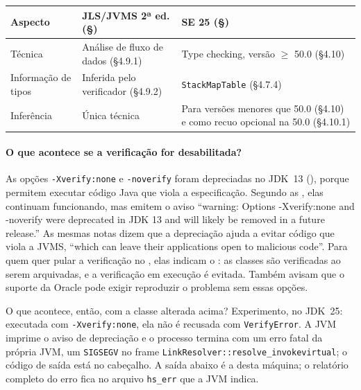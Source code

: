 \begin{center}
\begin{tabular}{@{}p{}p{}p{}@{}}
\toprule
Aspecto & JLS/JVMS 2ª ed. (§) & SE 25 (§) \\
\midrule
Técnica & Análise de fluxo de dados (§4.9.1) & Type checking, versão
$\geq$ 50.0 (§4.10) \\
Informação de tipos & Inferida pelo verificador (§4.9.2) &
\texttt{StackMapTable} (§4.7.4) \\
Inferência & Única técnica & Para versões menores que 50.0 (§4.10) e
como recuo opcional na 50.0 (§4.10.1) \\
\bottomrule
\end{tabular}
\end{center}

\paragraph{O que acontece se a verificação for desabilitada?}
As opções \texttt{-Xverify:none} e \texttt{-noverify} foram depreciadas
no JDK~13 (), porque permitem executar código
Java que viola a especificação. Segundo as ,
elas continuam funcionando, mas emitem o aviso \enquote{warning: Options
-Xverify:none and -noverify were deprecated in JDK 13 and will likely be
removed in a future release.} As mesmas notas dizem que a depreciação
ajuda a evitar código que viola a JVMS, \enquote{which can leave their
applications open to malicious code}. Para quem quer pular a verificação
no , elas indicam o
: as classes são
verificadas ao serem arquivadas, e a verificação em execução é evitada.
Também avisam que o suporte da Oracle pode exigir reproduzir o problema
sem essas opções.

O que acontece, então, com a classe alterada acima? Experimento, no
JDK~25: executada com \texttt{-Xverify:none}, ela não é recusada com
\texttt{VerifyError}. A JVM imprime o aviso de depreciação e o processo
termina com um erro fatal da própria JVM, um \texttt{SIGSEGV} no frame
\texttt{LinkResolver::resolve\_invokevirtual}; o código de saída está no
cabeçalho. A saída abaixo é a desta máquina; o relatório completo do
erro fica no arquivo \texttt{hs\_err} que a JVM indica.



